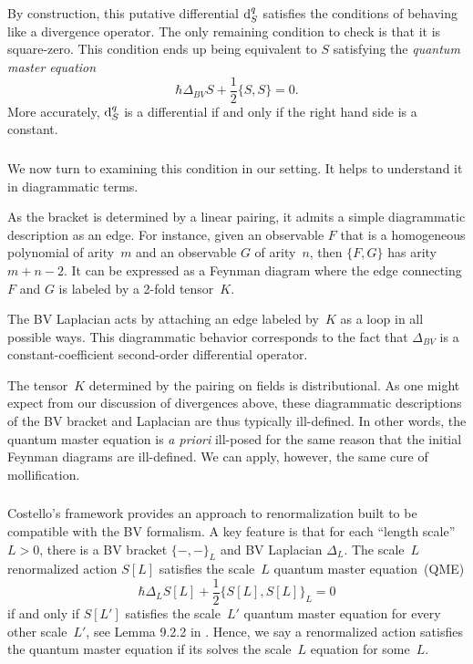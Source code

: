 By construction, this putative differential ${\rm d}_S^q$ satisfies the conditions of behaving like a divergence operator.
The only remaining condition to check is that it is square-zero.
This condition ends up being equivalent to $S$ satisfying the {\em quantum master equation}
\begin{equation}
\hbar \Delta_{BV} S + \frac{1}{2}\{S,S\} = 0.
\end{equation}
More accurately, ${\rm d}^q_S$ is a differential if and only if the right hand side is a constant.


\subsubsection{}

We now turn to examining this condition in our setting.
It helps to understand it in diagrammatic terms.


As the bracket is determined by a linear pairing,
it admits a simple diagrammatic description as an edge.
For instance, given an observable $F$ that is a homogeneous polynomial of arity~$m$
and an observable $G$ of arity~$n$, 
then $\{F,G\}$ has arity~$m+n-2$.
It can be expressed as a Feynman diagram 
where the edge connecting $F$ and $G$ is labeled by a 2-fold tensor~$K$.

The BV Laplacian acts by attaching an edge labeled by~$K$ as a loop in all possible ways.
This diagrammatic behavior corresponds to the fact that $\Delta_{BV}$ is a constant-coefficient second-order differential operator.

The tensor~$K$ determined by the pairing on fields is distributional.
As one might expect from our discussion of divergences above,
these diagrammatic descriptions of the BV bracket and Laplacian are thus typically ill-defined.
In other words, the quantum master equation is {\em a priori} ill-posed for the same reason that the initial Feynman diagrams are ill-defined.
We can apply, however, the same cure of mollification.

\subsubsection{}

Costello's framework \cite{CosBook} provides an approach to renormalization built to be compatible with the BV formalism.
A key feature is that for each ``length scale''~$L>0$, 
there is a BV bracket $\{-,-\}_L$ and BV Laplacian $\Delta_L$.
The scale~$L$ renormalized action $S[L]$ satisfies the scale~$L$ quantum master equation~(QME)
\[
\hbar \Delta_{L} S[L] + \frac{1}{2}\{S[L],S[L]\}_L = 0
\]
if and only if $S[L']$ satisfies the scale~$L'$ quantum master equation for every other scale~$L'$, see Lemma 9.2.2 in \cite{CosBook}.
Hence, we say a renormalized action satisfies the quantum master equation if its solves the scale~$L$ equation for some~$L$.

